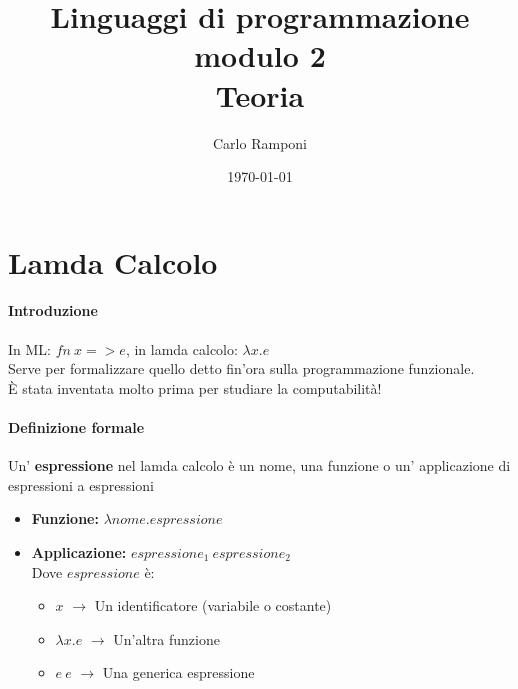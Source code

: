 \documentclass[a4paper,12pt]{article}
\title{Linguaggi di programmazione modulo 2\\Teoria}
\author{Carlo Ramponi}
\date{\today}
\begin{document}
\maketitle
\clearpage

\section*{Lamda Calcolo}
\paragraph{Introduzione\\}
In ML: $fn \  x => e$, in lamda calcolo: $\lambda x.e$\\
Serve per formalizzare quello detto fin'ora sulla programmazione funzionale.\\
È stata inventata molto prima per studiare la computabilità!

\paragraph{Definizione formale\\}
Un' \textbf{espressione} nel lamda calcolo è un nome, una funzione o un' applicazione di espressioni a espressioni\\
\begin{itemize}
	\item \textbf{Funzione:} $\lambda nome.espressione$
	\item \textbf{Applicazione:} $espressione_{1} \ espressione_{2}$\\
	Dove $espressione$ è:
	\begin{itemize}
		\item $x$ $\rightarrow$ Un identificatore (variabile o costante)
		\item $\lambda x.e$ $\rightarrow$ Un'altra funzione
		\item $e \ e$ $\rightarrow$ Una generica espressione
	\end{itemize}
\end{itemize}
\end{document}
